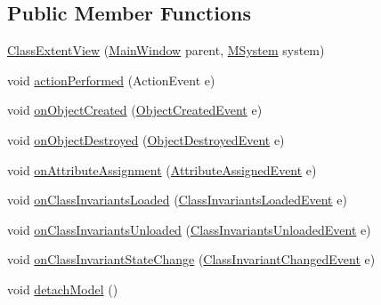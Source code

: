 \subsection*{Public Member Functions}
\begin{DoxyCompactItemize}
\item 
\hyperlink{classorg_1_1tzi_1_1use_1_1gui_1_1views_1_1_class_extent_view_afc8e5126073762a5d047eae1b248280f}{Class\-Extent\-View} (\hyperlink{classorg_1_1tzi_1_1use_1_1gui_1_1main_1_1_main_window}{Main\-Window} parent, \hyperlink{classorg_1_1tzi_1_1use_1_1uml_1_1sys_1_1_m_system}{M\-System} system)
\item 
void \hyperlink{classorg_1_1tzi_1_1use_1_1gui_1_1views_1_1_class_extent_view_ad4d0f60aeca16c6d64d79446d16f5c57}{action\-Performed} (Action\-Event e)
\item 
void \hyperlink{classorg_1_1tzi_1_1use_1_1gui_1_1views_1_1_class_extent_view_ab19c44d7ed145c712974cc05be803401}{on\-Object\-Created} (\hyperlink{classorg_1_1tzi_1_1use_1_1uml_1_1sys_1_1events_1_1_object_created_event}{Object\-Created\-Event} e)
\item 
void \hyperlink{classorg_1_1tzi_1_1use_1_1gui_1_1views_1_1_class_extent_view_a5fea9e0fd697675e6329fe95fc087448}{on\-Object\-Destroyed} (\hyperlink{classorg_1_1tzi_1_1use_1_1uml_1_1sys_1_1events_1_1_object_destroyed_event}{Object\-Destroyed\-Event} e)
\item 
void \hyperlink{classorg_1_1tzi_1_1use_1_1gui_1_1views_1_1_class_extent_view_a4a455bb919d614ce990dc6982b616d7c}{on\-Attribute\-Assignment} (\hyperlink{classorg_1_1tzi_1_1use_1_1uml_1_1sys_1_1events_1_1_attribute_assigned_event}{Attribute\-Assigned\-Event} e)
\item 
void \hyperlink{classorg_1_1tzi_1_1use_1_1gui_1_1views_1_1_class_extent_view_add760d495995a8438967694721260571}{on\-Class\-Invariants\-Loaded} (\hyperlink{classorg_1_1tzi_1_1use_1_1uml_1_1sys_1_1events_1_1_class_invariants_loaded_event}{Class\-Invariants\-Loaded\-Event} e)
\item 
void \hyperlink{classorg_1_1tzi_1_1use_1_1gui_1_1views_1_1_class_extent_view_a2eb06759516d9331e0a2dc328b819cb1}{on\-Class\-Invariants\-Unloaded} (\hyperlink{classorg_1_1tzi_1_1use_1_1uml_1_1sys_1_1events_1_1_class_invariants_unloaded_event}{Class\-Invariants\-Unloaded\-Event} e)
\item 
void \hyperlink{classorg_1_1tzi_1_1use_1_1gui_1_1views_1_1_class_extent_view_a59d33e62419d23dae97d5b6b1c1a3780}{on\-Class\-Invariant\-State\-Change} (\hyperlink{classorg_1_1tzi_1_1use_1_1uml_1_1sys_1_1events_1_1_class_invariant_changed_event}{Class\-Invariant\-Changed\-Event} e)
\item 
void \hyperlink{classorg_1_1tzi_1_1use_1_1gui_1_1views_1_1_class_extent_view_a57bb9d869ee98a87f456835262e509b3}{detach\-Model} ()
\end{DoxyCompactItemize}



